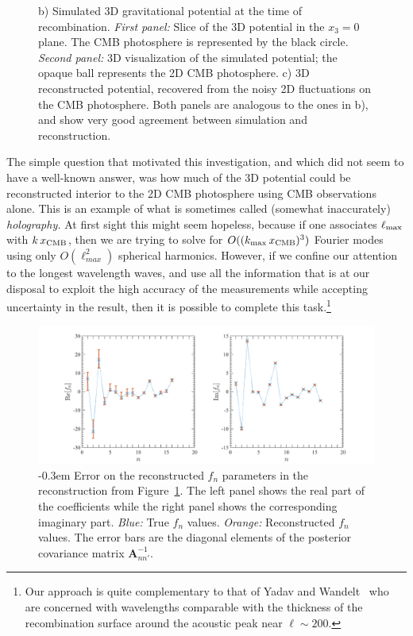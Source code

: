 \documentclass[psfig,12pt]{article}
\def\ni{\noindent}
\begin{document}
{\begin{figure}[t]
{{  b) Simulated 3D gravitational potential at the time
of recombination.  {\it First panel: } Slice of the 3D potential in the
$x_3=0$ plane. The CMB photosphere is represented by the black circle.  {\it Second panel: } 3D visualization of the simulated potential; the opaque ball represents the 2D CMB photosphere. c) 3D reconstructed potential, recovered from the noisy 2D fluctuations on the CMB photosphere. Both panels are analogous to the ones in b), and show very good agreement between simulation and reconstruction.
}}
\label{Fig:Mockreconstruction}
\end{figure}


\ni{\bf Preliminary Results:}
The simple question that motivated this investigation, and which did not
seem to have a well-known answer, was how much of the 3D potential could
be reconstructed interior to the 2D CMB photosphere using CMB
observations alone. This is an example of what is sometimes called (somewhat inaccurately) {\it
holography.} At first sight this might seem hopeless, because if one
associates $\ell_{\rm max}$ with $k\,x_{\rm CMB}$, then we are trying to
solve for $O((k_{\rm max}\,x_{\rm CMB})^3)$ Fourier modes using only
$O(\ell_{max}^2)$ spherical harmonics. However, if we confine our
attention to the longest wavelength waves, and
use all the information that is at our disposal to exploit the high
accuracy of the measurements while accepting uncertainty in the result,
then it is possible to complete this task.\footnote{Our approach is
quite complementary to that of Yadav and Wandelt~\cite{Yadav:2005} who
are concerned with wavelengths comparable with the thickness of the
recombination surface around the acoustic peak near $\ell\sim200$.}


\begin{figure}[t]
\vspace{-1cm}
\centering\includegraphics[width=0.8\linewidth]{figures/errorrec.pdf}
\caption{
\openup -0.3em
{\footnotesize
Error on the reconstructed $f_n$ parameters in the reconstruction from Figure~\ref{Fig:Mockreconstruction}. The left panel shows the real part of the coefficients while the right panel shows the corresponding imaginary part.
 {\it Blue:} True $f_n$ values. {\it Orange: } Reconstructed $f_n$ values. The error bars are the diagonal elements of the posterior covariance matrix $\mathbf{A}_{nn'}^{-1}$.
}}
\label{Fig:recerror}
\end{figure}


}
\end{document}
